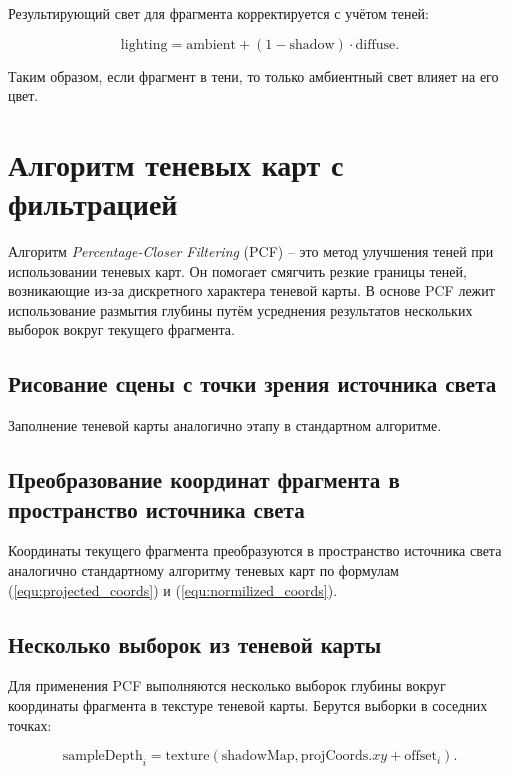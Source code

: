 Результирующий свет для фрагмента корректируется с учётом теней:

\begin{equation}
    \label{equ:shadow_map_lambert}
    \text{lighting} = \text{ambient} + (1 - \text{shadow}) \cdot \text{diffuse}.
\end{equation}

Таким образом, если фрагмент в тени, то только амбиентный свет влияет на его цвет.

\section{Алгоритм теневых карт с фильтрацией}

Алгоритм \textit{Percentage-Closer Filtering} (PCF) --
это метод улучшения теней при использовании теневых карт.
Он помогает смягчить резкие границы теней,
возникающие из-за дискретного характера теневой карты.
В основе PCF лежит использование размытия глубины
путём усреднения результатов нескольких выборок вокруг текущего фрагмента.

\subsection*{Рисование сцены с точки зрения источника света}

Заполнение теневой карты аналогично этапу в стандартном алгоритме.

\subsection*{Преобразование координат фрагмента в пространство источника света}

Координаты текущего фрагмента преобразуются в пространство источника света
аналогично стандартному алгоритму теневых карт по формулам (\ref{equ:projected_coords})
и (\ref{equ:normilized_coords}).

\subsection*{Несколько выборок из теневой карты}

Для применения PCF выполняются несколько выборок глубины
вокруг координаты фрагмента в текстуре теневой карты.
Берутся выборки в соседних точках:

\begin{equation}
    \label{equ:filtering_pcf}
    \text{sampleDepth}_i = \text{texture}(\text{shadowMap}, \text{projCoords}.xy + \text{offset}_i).
\end{equation}

